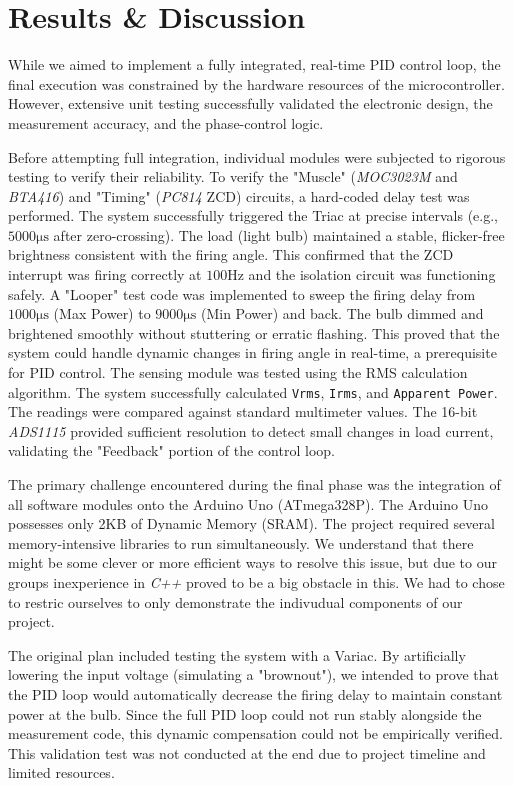 \documentclass[11pt]{article}
\begin{document}
\section{Results \& Discussion}
While we aimed to implement a fully integrated, real-time PID control loop, the final execution was constrained by the hardware resources of the microcontroller. However, extensive unit testing successfully validated the electronic design, the measurement accuracy, and the phase-control logic.

Before attempting full integration, individual modules were subjected to rigorous testing to verify their reliability. 
To verify the "Muscle" (\emph{MOC3023M} and \emph{BTA416}) and "Timing" (\emph{PC814} ZCD) circuits, a hard-coded delay test was performed. The system successfully triggered the Triac at precise intervals (e.g., $5000\si{\micro\second}$ after zero-crossing). The load (light bulb) maintained a stable, flicker-free brightness consistent with the firing angle. This confirmed that the ZCD interrupt was firing correctly at $100\si{\hertz}$ and the isolation circuit was functioning safely.
A "Looper" test code was implemented to sweep the firing delay from $1000\si{\micro\second}$ (Max Power) to $9000\si{\micro\second}$ (Min Power) and back. The bulb dimmed and brightened smoothly without stuttering or erratic flashing. This proved that the system could handle dynamic changes in firing angle in real-time, a prerequisite for PID control.
The sensing module was tested using the RMS calculation algorithm. The system successfully calculated \verb|Vrms|, \verb|Irms|, and \verb|Apparent Power|. The readings were compared against standard multimeter values. The 16-bit \emph{ADS1115} provided sufficient resolution to detect small changes in load current, validating the "Feedback" portion of the control loop.

The primary challenge encountered during the final phase was the integration of all software modules onto the Arduino Uno (ATmega328P). The Arduino Uno possesses only 2KB of Dynamic Memory (SRAM). The project required several memory-intensive libraries to run simultaneously. We understand that there might be some clever or more efficient ways to resolve this issue, but due to our groups inexperience in \emph{C++} proved to be a big obstacle in this. We had to chose to restric ourselves to only demonstrate the indivudual components of our project.

The original plan included testing the system with a Variac. By artificially lowering the input voltage (simulating a "brownout"), we intended to prove that the PID loop would automatically decrease the firing delay to maintain constant power at the bulb. Since the full PID loop could not run stably alongside the measurement code, this dynamic compensation could not be empirically verified. This validation test was not conducted at the end due to project timeline and limited resources.
\end{document}
